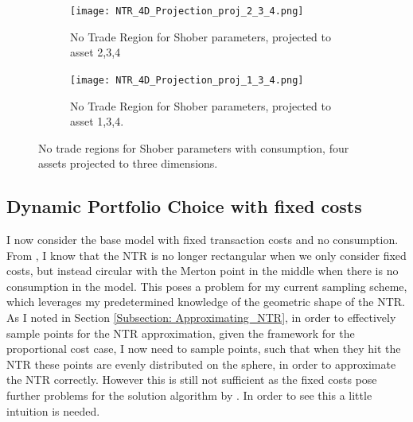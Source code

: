 \documentclass[11pt]{article}
\begin{document}
\begin{figure}[!ht]
    \centering
    \begin{subfigure}[t]{0.48\textwidth}
        \centering
        \texttt{[image: NTR\_4D\_Projection\_proj\_2\_3\_4.png]}
        \caption{No Trade Region for Shober parameters, projected to asset 2,3,4}
    \end{subfigure}%
    \hfill
    \begin{subfigure}[t]{0.48\textwidth}
        \centering
        \texttt{[image: NTR\_4D\_Projection\_proj\_1\_3\_4.png]}
        \caption{No Trade Region for Shober parameters, projected to asset 1,3,4.}        %
    \end{subfigure}
    \caption{No trade regions for Shober parameters with consumption, four assets projected to three dimensions.}
\end{figure}
\FloatBarrier 


\subsection{Dynamic Portfolio Choice with fixed costs} \label{Subsection: Results_FixedCosts_No_Correlation}
I now consider the base model with fixed transaction costs and no consumption.
From \autocite{Dybvig2020}, I know that the \ac{NTR} is no longer rectangular when we only consider fixed costs, but instead circular
with the Merton point in the middle when there is no consumption in the model.
This poses a problem for my current sampling scheme, which leverages my predetermined knowledge of the geometric shape of the \ac{NTR}.
As I noted in Section \ref{Subsection: Approximating_NTR}, in order to effectively sample points for the \ac{NTR} approximation, given the framework for the proportional cost case,
I now need to sample points, such that when they hit the \ac{NTR} these points are evenly distributed on the sphere, in order to approximate the \ac{NTR} correctly.
However this is still not sufficient as the fixed costs pose further problems for the solution algorithm by \autocite{Scheidegger2023}.
In order to see this a little intuition is needed.
\end{document}
